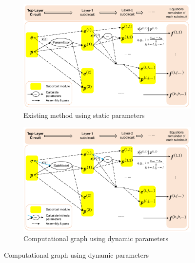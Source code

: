 \begin{figure}[htpb]
	\centering
	\begin{subfigure}{0.49\textwidth}
		\includegraphics[width=\textwidth]{fig/static-engine.pdf}
		\caption{Existing method using static parameters}
		\label{fig:static-engine}
	\end{subfigure}
	\begin{subfigure}{0.49\textwidth}
		\includegraphics[width=\textwidth]{fig/computational-graph.pdf}
		\caption{Computational graph using dynamic parameters}
		\label{fig:computational-graph}
	\end{subfigure}

\end{figure}
